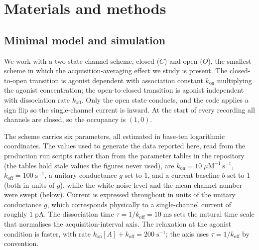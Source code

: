 \section*{Materials and methods}


\subsection*{Minimal model and simulation}

We work with a two-state channel scheme, closed ($C$) and open ($O$), the smallest
scheme in which the acquisition-averaging effect we study is present.
The closed-to-open transition is agonist dependent with association constant
$k_{\mathrm{on}}$ multiplying the agonist concentration; the open-to-closed
transition is agonist independent with dissociation rate $k_{\mathrm{off}}$. Only
the open state conducts, and the code applies a sign flip so the single-channel
current is inward. At the start of every recording all channels are closed, so the
occupancy is $(1,0)$.

The scheme carries six parameters, all estimated in base-ten logarithmic
coordinates. The values used to generate the data reported here, read from the
production run scripts rather than from the parameter tables in the repository
(the tables hold stale values the figures never used), are
$k_{\mathrm{on}} = 10\;\mu\mathrm{M}^{-1}\,\mathrm{s}^{-1}$,
$k_{\mathrm{off}} = 100\;\mathrm{s}^{-1}$,
a unitary conductance $g$ set to $1$, and a current baseline $b$ set to $1$
(both in units of $g$),
while the white-noise level and the mean channel number were swept (below). Current
is expressed throughout in units of the unitary conductance $g$, which corresponds
physically to a single-channel current of roughly $1\;\mathrm{pA}$.
The dissociation time $\tau = 1/k_{\mathrm{off}} = 10\;\mathrm{ms}$ sets the natural
time scale that normalises the acquisition-interval axis. The relaxation at the
agonist condition is faster, with rate $k_{\mathrm{on}}[A] + k_{\mathrm{off}} =
200\;\mathrm{s}^{-1}$; the axis uses $\tau = 1/k_{\mathrm{off}}$ by convention.

